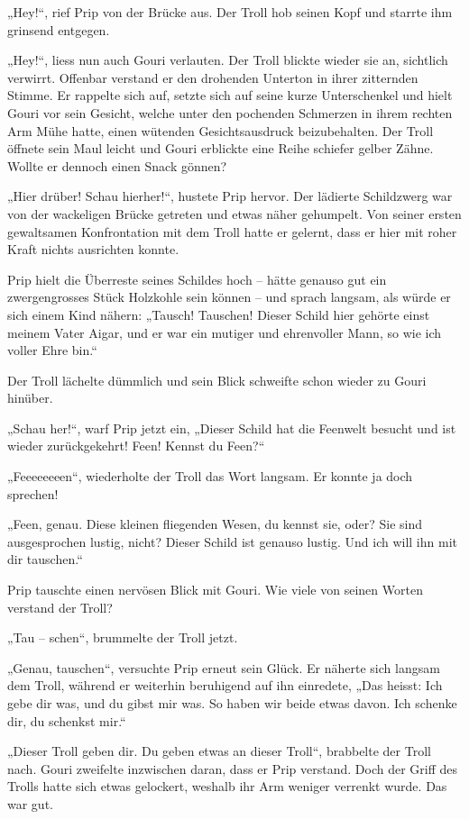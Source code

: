„Hey!“, rief Prip von der Brücke aus. Der Troll hob seinen Kopf und starrte ihm grinsend entgegen.

„Hey!“, liess nun auch Gouri verlauten. Der Troll blickte wieder sie an, sichtlich verwirrt. Offenbar verstand er den drohenden Unterton in ihrer zitternden Stimme. Er rappelte sich auf, setzte sich auf seine kurze Unterschenkel und hielt Gouri vor sein Gesicht, welche unter den pochenden Schmerzen in ihrem rechten Arm Mühe hatte, einen wütenden Gesichtsausdruck beizubehalten. Der Troll öffnete sein Maul leicht und Gouri erblickte eine Reihe schiefer gelber Zähne. Wollte er dennoch einen Snack gönnen?

„Hier drüber! Schau hierher!“, hustete Prip hervor. Der lädierte Schildzwerg war von der wackeligen Brücke getreten und etwas näher gehumpelt. Von seiner ersten gewaltsamen Konfrontation mit dem Troll hatte er gelernt, dass er hier mit roher Kraft nichts ausrichten konnte.

Prip hielt die Überreste seines Schildes hoch – hätte genauso gut ein zwergengrosses Stück Holzkohle sein können – und sprach langsam, als würde er sich einem Kind nähern: „Tausch! Tauschen! Dieser Schild hier gehörte einst meinem Vater Aigar, und er war ein mutiger und ehrenvoller Mann, so wie ich voller Ehre bin.“

Der Troll lächelte dümmlich und sein Blick schweifte schon wieder zu Gouri hinüber.

„Schau her!“, warf Prip jetzt ein, „Dieser Schild hat die Feenwelt besucht und ist wieder zurückgekehrt! Feen! Kennst du Feen?“

„Feeeeeeeen“, wiederholte der Troll das Wort langsam. Er konnte ja doch sprechen!

„Feen, genau. Diese kleinen fliegenden Wesen, du kennst sie, oder? Sie sind ausgesprochen lustig, nicht? Dieser Schild ist genauso lustig. Und ich will ihn mit dir tauschen.“

Prip tauschte einen nervösen Blick mit Gouri. Wie viele von seinen Worten verstand der Troll?

„Tau – schen“, brummelte der Troll jetzt.

„Genau, tauschen“, versuchte Prip erneut sein Glück. Er näherte sich langsam dem Troll, während er weiterhin beruhigend auf ihn einredete, „Das heisst: Ich gebe dir was, und du gibst mir was. So haben wir beide etwas davon. Ich schenke dir, du schenkst mir.“

„Dieser Troll geben dir. Du geben etwas an dieser Troll“, brabbelte der Troll nach. Gouri zweifelte inzwischen daran, dass er Prip verstand. Doch der Griff des Trolls hatte sich etwas gelockert, weshalb ihr Arm weniger verrenkt wurde. Das war gut.

